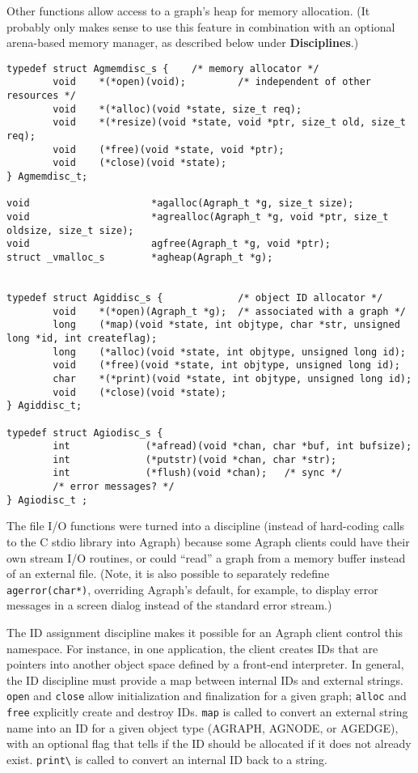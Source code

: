 \documentclass[11pt,letterpaper]{article}
\begin{document}
Other functions allow access to a graph's heap for memory allocation.
(It probably only makes sense to use this feature in combination with
an optional arena-based memory manager, as described below under
{\bf Disciplines}.)

\begin{verbatim}
typedef struct Agmemdisc_s {    /* memory allocator */
        void    *(*open)(void);         /* independent of other resources */
        void    *(*alloc)(void *state, size_t req);
        void    *(*resize)(void *state, void *ptr, size_t old, size_t req);
        void    (*free)(void *state, void *ptr);
        void    (*close)(void *state);
} Agmemdisc_t;

void                     *agalloc(Agraph_t *g, size_t size);
void                     *agrealloc(Agraph_t *g, void *ptr, size_t oldsize, size_t size);
void                     agfree(Agraph_t *g, void *ptr);
struct _vmalloc_s        *agheap(Agraph_t *g);


typedef struct Agiddisc_s {             /* object ID allocator */
        void    *(*open)(Agraph_t *g);  /* associated with a graph */
        long    (*map)(void *state, int objtype, char *str, unsigned long *id, int createflag);
        long    (*alloc)(void *state, int objtype, unsigned long id);
        void    (*free)(void *state, int objtype, unsigned long id);
        char    *(*print)(void *state, int objtype, unsigned long id);
        void    (*close)(void *state);
} Agiddisc_t;

typedef struct Agiodisc_s {
        int             (*afread)(void *chan, char *buf, int bufsize);
        int             (*putstr)(void *chan, char *str);
        int             (*flush)(void *chan);   /* sync */
        /* error messages? */
} Agiodisc_t ;
\end{verbatim}

The file I/O functions were turned into a discipline
(instead of hard-coding calls to the C stdio library into Agraph)
because some Agraph clients could have their own stream I/O routines,
or could ``read'' a graph from a memory buffer instead of an external file.
(Note, it is also possible to separately redefine \verb"agerror(char*)",
overriding Agraph's default, for example, to display error messages in a
screen dialog instead of the standard error stream.)

The ID assignment discipline makes it possible for an Agraph client
control this namespace.  For instance, in one application, the client
creates IDs that are pointers into another object space defined by
a front-end interpreter.  In general, the ID discipline must provide
a map between internal IDs and external strings.  
\verb"open" and \verb"close" allow initialization and finalization
for a given graph; \verb"alloc" and \verb"free" explicitly create
and destroy IDs.  \verb"map" is called to convert an external string
name into an ID for a given object type (AGRAPH, AGNODE, or AGEDGE),
with an optional flag that tells if the ID should be allocated if
it does not already exist.  \verb"print\" is called to convert an
internal ID back to a string.
\end{document}
